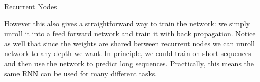 \documentclass[10pt, table, dvipsnames,xcdraw, handout]{beamer}
\def\layersep{2.5cm}
\begin{document}
\begin{frame}[fragile]{Recurrent Nodes}
\begin{minipage}[t][0.5\textheight][t]{\textwidth}
\begin{center}
\end{center}
  \end{minipage}
  \vfill
\begin{minipage}[t][0.5\textheight][t]{\textwidth}
However this also gives a straightforward way to train the network: we simply unroll it into a feed forward network and train it with back propagation. Notice as well that since the weights are shared between recurrent nodes we can unroll network to any depth we want. In principle, we could train on short sequences and then use the network to predict long sequences. Practically, this means the same RNN can be used for many different tasks. 
\end{minipage}
\end{frame}
\end{document}

